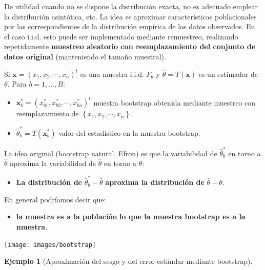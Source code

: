 \documentclass[
]{book}
\providecommand{\tightlist}{%
  \setlength{\itemsep}{0pt}\setlength{\parskip}{0pt}}
\theoremstyle{break}
\theoremstyle{definition}
\theoremstyle{definition}
\newtheorem{example}{Ejemplo}[chapter]
\theoremstyle{definition}
\theoremstyle{definition}
\theoremstyle{remark}
\begin{document}
De utilidad cuando no se dispone la distribución exacta, no es
adecuado emplear la distribución asintótica, etc.
La idea es aproximar características poblacionales por las
correspondientes de la distribución empírica de los
datos observados.
En el caso i.i.d. esto puede ser implementado mediante remuestreo,
realizando repetidamente \textbf{muestreo aleatorio con reemplazamiento
del conjunto de datos original} (manteniendo el tamaño muestral).

Si \(\mathbf{x} = \left( x_{1},x_{2},\cdots ,x_{n}\right) ^{t}\) es una
muestra i.i.d. \(F_{\theta }\) y
\(\hat{\theta} = T\left( \mathbf{x} \right)\)
es un estimador de \(\theta\).
Para \(b = 1,\ldots ,B:\)

\begin{itemize}
\item
  \(\mathbf{x}_{b}^{\ast } = \left( x_{b1}^{\ast },x_{b2}^{\ast },\cdots ,x_{bn}^{\ast }\right) ^{t}\) muestra bootstrap obtenida mediante
  muestreo con reemplazamiento de
  \(\left\{ x_{1},x_{2},\cdots ,x_{n}\right\}\).
\item
  \(\hat{\theta}_{b}^{\ast } = T\left( \mathbf{x}_{b}^{\ast }\right)\)
  valor del estadístico en la muestra bootstrap.
\end{itemize}

La idea original (bootstrap natural, Efron) es que la variabilidad
de \(\hat{\theta}_{b}^{\ast }\) en torno a \(\hat{\theta}\) aproxima la
variabilidad de \(\hat{\theta}\) en torno a \(\theta\):

\begin{itemize}
\tightlist
\item
  \textbf{La distribución de} \(\hat{\theta}_{b}^{\ast }-\hat{\theta}\)
  \textbf{aproxima la distribución de} \(\hat{\theta}-\theta\).
\end{itemize}

En general podríamos decir que:

\begin{itemize}
\tightlist
\item
  \textbf{la muestra es a la población}
  \textbf{lo que la muestra bootstrap es a la muestra}.
\end{itemize}

\begin{center}\texttt{[image: images/bootstrap]} \end{center}

\begin{example}[Aproximación del sesgo y del error estándar mediante bootstrap]
\protect\hypertarget{exm:mean-median-boot}{}{\label{exm:mean-median-boot} {} }
\end{example}
\end{document}
